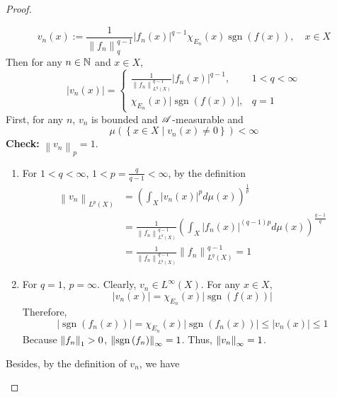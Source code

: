 \begin{proof}
\begin{enumerate}[label=(\roman*)]
\begin{equation*}
			v_n(x):=\frac{1}{\left\|f_n\right\|_{q}^{q-1}}\left|f_n(x)\right|^{q-1} \chi_{E_n}(x) \operatorname{sgn}(f(x)),\quad x \in X
		\end{equation*}
		Then for any $n \in \mathbb{N}$ and $x \in X$,
		\begin{equation*}
			\left|v_n(x)\right|= \begin{cases}\frac{1}{\left\|f_n\right\|_{L^q(X)}^{q-1}}\left|f_n(x)\right|^{q-1}, & 1<q<\infty \\ \chi_{E_n}(x)|\operatorname{sgn}(f(x))|, & q=1\end{cases}
		\end{equation*}
		First, for any $n$, $v_n$ is bounded and $\mathscr{A}$-measurable and 
		\begin{equation*}
			\mu\left(\left\{x \in X \mid v_n(x) \neq 0\right\}\right)<\infty
		\end{equation*}
		\textbf{Check:} $\left\|v_n\right\|_{p}=1$.
		\begin{enumerate}[label=(\alph*)]
			\item For $1 < q < \infty$, $1 < p = \frac{q}{q-1} < \infty$, by the definition
			\begin{equation*}
				\begin{aligned}
					\left\|v_n\right\|_{L^p(X)} & =\left(\int_X\left|v_n(x)\right|^p d \mu(x)\right)^{\frac{1}{p}} \\
					& =\frac{1}{\left\|f_n\right\|_{L^q(X)}^{q-1}}\left(\int_X\left|f_n(x)\right|^{(q-1) p} d \mu(x)\right)^{\frac{q-1}{q}} \\
					& =\frac{1}{\left\|f_n\right\|_{L^q(X)}^{q-1}}\left\|f_n\right\|_{L^q(X)}^{q-1}=1
				\end{aligned}
			\end{equation*}
			\item For $q = 1$, $p = \infty$. Clearly, $v_n \in L^\infty(X)$. For any $x \in X$,
			\begin{equation*}
				\left|v_n(x)\right|=\chi_{E_n}(x)|\operatorname{sgn}(f(x))|
			\end{equation*}
			Therefore,
			\begin{equation*}
				\left|\operatorname{sgn}\left(f_n(x)\right)\right|=\chi_{E_n}(x)\left|\operatorname{sgn}\left(f_n(x)\right)\right| \leq\left|v_n(x)\right| \leq 1
			\end{equation*}
			Because $\left\lVert f_n\right\lVert_1 > 0$, $\left\lVert\operatorname{sgn}\left(f_n\right)\right\lVert_\infty =1$. Thus, $\left\lVert v_n\right\lVert_\infty = 1$.
		\end{enumerate}
		Besides, by the definition of $v_n$, we have
		\begin{equation*}

\end{equation*}
\end{enumerate}
\end{proof}
